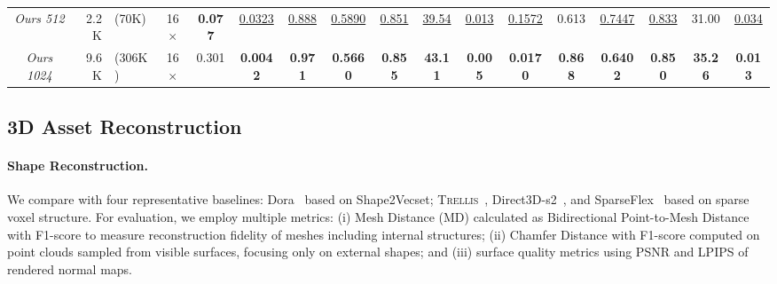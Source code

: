 \documentclass[10pt,twocolumn,letterpaper]{article}
\begin{document}
\begin{table}[t]
\begin{tabular}{cr@{\,}lcccccccccccccc}
        \textit{Ours 512} & 2.2K & \tiny{(70K)} & 16$\times$ & \textbf{\cellcolor[rgb]{0.80,1.00,0.80}0.077} & \underline{\cellcolor[rgb]{0.87,1.00,0.80}0.0323} & \underline{\cellcolor[rgb]{0.83,1.00,0.80}0.888} & \underline{\cellcolor[rgb]{0.80,1.00,0.80}0.5890} & \underline{\cellcolor[rgb]{0.80,1.00,0.80}0.851} & \underline{\cellcolor[rgb]{0.88,1.00,0.80}39.54} & \underline{\cellcolor[rgb]{0.82,1.00,0.80}0.013} & \underline{\cellcolor[rgb]{0.88,1.00,0.80}0.1572} & \cellcolor[rgb]{0.92,1.00,0.80}0.613 & \underline{\cellcolor[rgb]{0.81,1.00,0.80}0.7447} & \underline{\cellcolor[rgb]{0.81,1.00,0.80}0.833} & \cellcolor[rgb]{0.93,1.00,0.80}31.00 & \underline{\cellcolor[rgb]{0.85,1.00,0.80}0.034} \\
        \textit{Ours 1024} & 9.6K & \tiny{(306K)} & 16$\times$ & \cellcolor[rgb]{0.89,1.00,0.80}0.301 & \textbf{\cellcolor[rgb]{0.80,1.00,0.80}0.0042} & \textbf{\cellcolor[rgb]{0.80,1.00,0.80}0.971} & \textbf{\cellcolor[rgb]{0.80,1.00,0.80}0.5660} & \textbf{\cellcolor[rgb]{0.80,1.00,0.80}0.855} & \textbf{\cellcolor[rgb]{0.80,1.00,0.80}43.11} & \textbf{\cellcolor[rgb]{0.80,1.00,0.80}0.005} & \textbf{\cellcolor[rgb]{0.80,1.00,0.80}0.0170} & \textbf{\cellcolor[rgb]{0.80,1.00,0.80}0.868} & \textbf{\cellcolor[rgb]{0.80,1.00,0.80}0.6402} & \textbf{\cellcolor[rgb]{0.80,1.00,0.80}0.850} & \textbf{\cellcolor[rgb]{0.80,1.00,0.80}35.26} & \textbf{\cellcolor[rgb]{0.80,1.00,0.80}0.013} \\
        \bottomrule
        \end{tabular}
        \vspace{-8pt}
        \label{tab:reconstruction}
\end{table}


\subsection{3D Asset Reconstruction}

\paragraph{Shape Reconstruction.}
We compare with four representative baselines: Dora~\cite{chen2025dora} based on Shape2Vecset; \textsc{Trellis}~\cite{xiang2025structured}, Direct3D-s2~\cite{wu2025direct3d}, and SparseFlex~\cite{he2025sparseflex} based on sparse voxel structure.
For evaluation, we employ multiple metrics: (i) Mesh Distance (MD) calculated as Bidirectional Point-to-Mesh Distance with F1-score to measure reconstruction fidelity of meshes including internal structures; (ii) Chamfer Distance with F1-score computed on point clouds sampled from visible surfaces, focusing only on external shapes; and (iii) surface quality metrics using PSNR and LPIPS of rendered normal maps.
\end{document}
